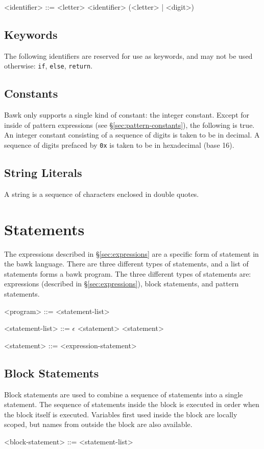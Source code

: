 \documentclass[letterpaper]{article}
\begin{document}
\begin{grammar}
<identifier> ::= <letter>
\alt <identifier> (<letter> | <digit>)
\end{grammar}

\subsection{Keywords}
The following identifiers are reserved for use as keywords, and may not be used otherwise: \texttt{if}, \texttt{else}, \texttt{return}.

\subsection{Constants}
\label{sec:constants}
Bawk only supports a single kind of constant: the integer constant.  Except for inside of pattern expressions (see \S\ref{sec:pattern-constants}), the following is true.  An integer constant consisting of a sequence of digits is taken to be in decimal.  A sequence of digits prefaced by \texttt{0x} is taken to be in hexadecimal (base 16).

\subsection{String Literals}
A string is a sequence of characters enclosed in double quotes.

\section{Statements}
\label{sec:statements}
The expressions described in \S\ref{sec:expressions} are a specific form of statement in the bawk language.  There are three different types of statements, and a list of statements forms a bawk program.  The three different types of statements are: expressions (described in \S\ref{sec:expressions}), block statements, and pattern statements.
\begin{grammar}
<program> ::= <statement-list>

<statement-list> ::= $\epsilon$
\alt <statement>
 <statement>

<statement> ::= <expression-statement>
\end{grammar}

\subsection{Block Statements}
Block statements are used to combine a sequence of statements into a single statement.  The sequence of statements inside the block is executed in order when the block itself is executed.  Variables first used inside the block are locally scoped, but names from outside the block are also available.
\begin{grammar}
<block-statement> ::= <statement-list>
\end{grammar}
\end{document}
